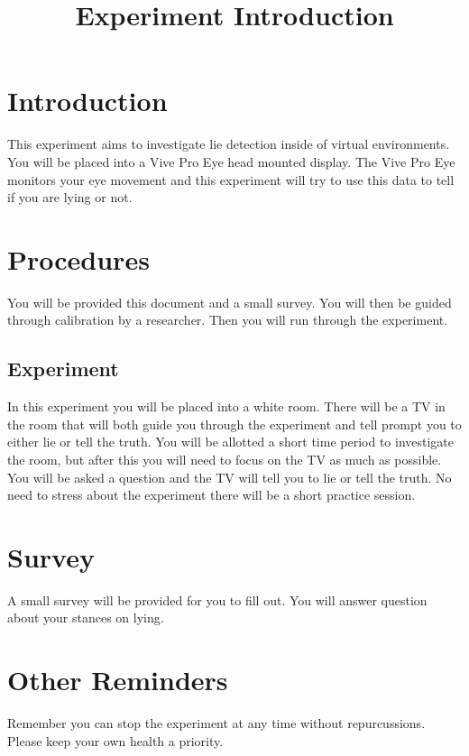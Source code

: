 \documentclass[11pt]{article}
\title{Experiment Introduction}
\date{}
\author{}
\begin{document}
  \maketitle
  \section{Introduction}
  This experiment aims to investigate lie detection inside of virtual environments. You will be placed into a Vive Pro Eye head mounted display. The Vive Pro Eye monitors your eye movement and this experiment will try to use this data to tell if you are lying or not. 
  \section{Procedures}
  You will be provided this document and a small survey. You will then be guided through calibration by a researcher. Then you will run through the experiment. 
  \subsection{Experiment}
  In this experiment you will be placed into a white room. There will be a TV in the room that will both guide you through the experiment and tell prompt you to either lie or tell the truth. You will be allotted a short time period to investigate the room, but after this you will need to focus on the TV as much as possible. You will be asked a question and the TV will tell you to lie or tell the truth. No need to stress about the experiment there will be a short practice session.
  \section{Survey}
  A small survey will be provided for you to fill out. You will answer question about your stances on lying.
  \section{Other Reminders}
  Remember you can stop the experiment at any time without repurcussions. Please keep your own health a priority. 
\end{document}
